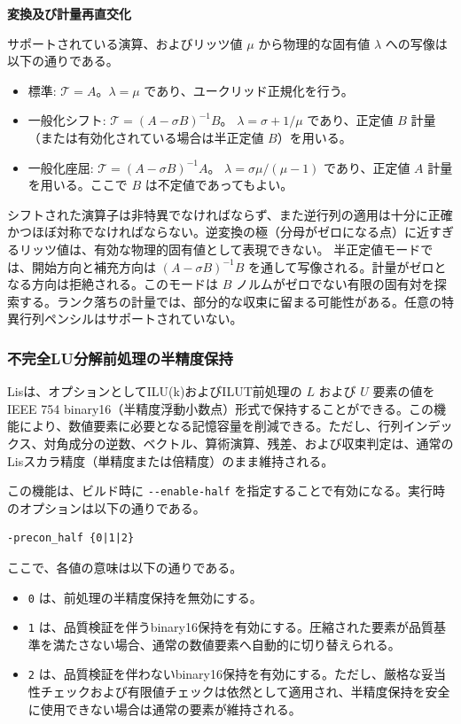 \documentclass[a4paper]{jarticle}
\begin{document}
{{\noindent
{\bf 変換及び計量再直交化}

サポートされている演算、およびリッツ値 $\mu$ から物理的な固有値 $\lambda$ への写像は以下の通りである。
\begin{itemize}
\item 標準: $\mathcal{T}=A$。$\lambda=\mu$ であり、ユークリッド正規化を行う。
\item 一般化シフト: $\mathcal{T}=(A-\sigma B)^{-1}B$。
$\lambda=\sigma+1/\mu$ 
であり、正定値 $B$ 計量（または有効化されている場合は半正定値 $B$）を用いる。
\item 一般化座屈: $\mathcal{T}=(A-\sigma B)^{-1}A$。
$\lambda=\sigma\mu/(\mu-1)$
 であり、正定値 $A$ 計量を用いる。ここで $B$ は不定値であってもよい。
\end{itemize}
シフトされた演算子は非特異でなければならず、また逆行列の適用は十分に正確かつほぼ対称でなければならない。逆変換の極（分母がゼロになる点）に近すぎるリッツ値は、有効な物理的固有値として表現できない。
半正定値モードでは、開始方向と補充方向は $(A-\sigma B)^{-1}B$ を通して写像される。計量がゼロとなる方向は拒絶される。このモードは $B$ ノルムがゼロでない有限の固有対を探索する。ランク落ちの計量では、部分的な収束に留まる可能性がある。任意の特異行列ペンシルはサポートされていない。


\subsubsection{不完全LU分解前処理の半精度保持}
Lisは、オプションとしてILU(k)およびILUT前処理の $L$ および $U$ 要素の値をIEEE 754 binary16（半精度浮動小数点）形式で保持することができる。この機能により、数値要素に必要となる記憶容量を削減できる。ただし、行列インデックス、対角成分の逆数、ベクトル、算術演算、残差、および収束判定は、通常のLisスカラ精度（単精度または倍精度）のまま維持される。

この機能は、ビルド時に \verb|--enable-half| を指定することで有効になる。実行時のオプションは以下の通りである。

\begin{verbatim}
-precon_half {0|1|2}
\end{verbatim}

ここで、各値の意味は以下の通りである。

\begin{itemize}
\item \verb|0| は、前処理の半精度保持を無効にする。
\item \verb|1| は、品質検証を伴うbinary16保持を有効にする。圧縮された要素が品質基準を満たさない場合、通常の数値要素へ自動的に切り替えられる。
\item \verb|2| は、品質検証を伴わないbinary16保持を有効にする。ただし、厳格な妥当性チェックおよび有限値チェックは依然として適用され、半精度保持を安全に使用できない場合は通常の要素が維持される。
\end{itemize}

}}
\end{document}
